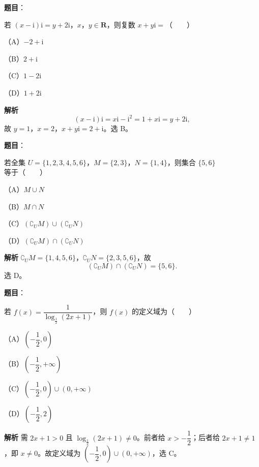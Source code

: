 
\begin{answer}

\textbf{题目}：

若 $(x-\mathrm i)\mathrm i=y+2\mathrm i$，$x$，$y\in\mathbf R$，则复数 $x+y\mathrm i=$\mbox{（　　）}

（A）$-2+\mathrm i$

（B）$2+\mathrm i$

（C）$1-2\mathrm i$

（D）$1+2\mathrm i$

\textbf{解析}
\nopagebreak[4]
\[(x-\mathrm i)\mathrm i=x\mathrm i-\mathrm i^2=1+x\mathrm i=y+2\mathrm i,\]
故 $y=1$，$x=2$，$x+y\mathrm i=2+\mathrm i$。选 B。


\end{answer}
\begin{answer}

\textbf{题目}：

若全集 $U=\{1,2,3,4,5,6\}$，$M=\{2,3\}$，$N=\{1,4\}$，则集合 $\{5,6\}$ 等于\mbox{（　　）}

（A）$M\cup N$

（B）$M\cap N$

（C）$(\complement_UM)\cup(\complement_UN)$

（D）$(\complement_UM)\cap(\complement_UN)$

\textbf{解析}
$\complement_UM=\{1,4,5,6\}$，$\complement_UN=\{2,3,5,6\}$，故
\nopagebreak[4]
\[(\complement_UM)\cap(\complement_UN)=\{5,6\}.\]
选 D。


\end{answer}
\begin{answer}

\textbf{题目}：

若 $f(x)=\dfrac1{\log_{\frac12}(2x+1)}$，则 $f(x)$ 的定义域为\mbox{（　　）}

（A）$\left(-\dfrac12,0\right)$

（B）$\left(-\dfrac12,+\infty\right)$

（C）$\left(-\dfrac12,0\right)\cup(0,+\infty)$

（D）$\left(-\dfrac12,2\right)$

\textbf{解析}
需 $2x+1>0$ 且 $\log_{\frac12}(2x+1)\neq0$。前者给 $x>-\dfrac12$；后者给 $2x+1\neq1$，即 $x\neq0$。故定义域为 $\left(-\dfrac12,0\right)\cup(0,+\infty)$，选 C。


\end{answer}
